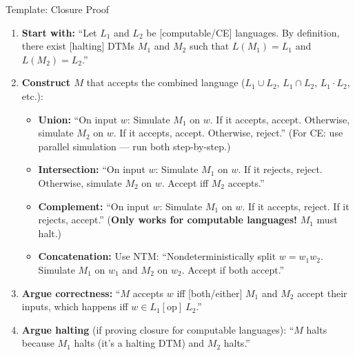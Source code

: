 \documentclass[11pt,a4paper]{article}
\begin{document}
\begin{templatebox}{Template: Closure Proof}
\begin{enumerate}
    \item \textbf{Start with:} ``Let $L_1$ and $L_2$ be [computable/CE] languages. By definition, there exist [halting] DTMs $M_1$ and $M_2$ such that $L(M_1) = L_1$ and $L(M_2) = L_2$.''

    \item \textbf{Construct $M$} that accepts the combined language ($L_1 \cup L_2$, $L_1 \cap L_2$, $L_1 \cdot L_2$, etc.):

    \begin{itemize}
        \item \textbf{Union:} ``On input $w$: Simulate $M_1$ on $w$. If it accepts, accept. Otherwise, simulate $M_2$ on $w$. If it accepts, accept. Otherwise, reject.'' (For CE: use parallel simulation --- run both step-by-step.)

        \item \textbf{Intersection:} ``On input $w$: Simulate $M_1$ on $w$. If it rejects, reject. Otherwise, simulate $M_2$ on $w$. Accept iff $M_2$ accepts.''

        \item \textbf{Complement:} ``On input $w$: Simulate $M_1$ on $w$. If it accepts, reject. If it rejects, accept.'' (\textbf{Only works for computable languages!} $M_1$ must halt.)

        \item \textbf{Concatenation:} Use NTM: ``Nondeterministically split $w = w_1 w_2$. Simulate $M_1$ on $w_1$ and $M_2$ on $w_2$. Accept if both accept.''
    \end{itemize}

    \item \textbf{Argue correctness:} ``$M$ accepts $w$ iff [both/either] $M_1$ and $M_2$ accept their inputs, which happens iff $w \in L_1 [\text{op}]\ L_2$.''

    \item \textbf{Argue halting} (if proving closure for computable languages): ``$M$ halts because $M_1$ halts (it's a halting DTM) and $M_2$ halts.''
\end{enumerate}
\end{templatebox}
\end{document}
